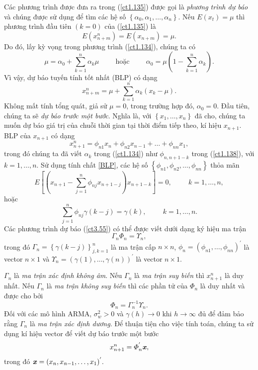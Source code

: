 \documentclass[12pt, a4paper,oneside]{book}
\theoremstyle{definition}
\begin{document}
Các phương trình được đưa ra trong (\ref{ct1.135}) được gọi là \textit{phương trình dự báo} và chúng được sử dụng để tìm các hệ số $\left\lbrace\alpha_{0}, \alpha_{1} ,\dots,\alpha_{n}\right\rbrace$. Nếu $E(x_{t}) =\mu $ thì phương trình đầu tiên $(k = 0)$ của (\ref{ct1.135}) là $$E(x_{n+m}^n)= E (x_{n+m})= \mu.$$
Do đó, lấy kỳ vọng trong phương trình (\ref{ct1.134}), chúng ta có
$$\mu= \alpha_{0} + \sum_{k=1}^{n} \alpha_k\mu \hspace{1cm} \text{hoặc} \hspace{1cm} \alpha_0 =\mu(1-\sum_{k=1}^{n}\alpha_k).$$ 	
Vì vậy, dự báo tuyến tính tốt nhất (BLP) có dạng
$$x_{n+m}^{n}=\mu+\sum_{k=1}^{n}\alpha_k(x_k-\mu).$$
Không mất tính tổng quát, giả sử $ \mu= 0$, trong trường hợp đó, $\alpha_{0} = 0.$ Đầu tiên, chúng ta sẽ \textit{dự báo trước một bước}. Nghĩa là, với $\left\lbrace x_{1}, \dots, x_{n}\right\rbrace$ đã cho, chúng ta muốn dự báo giá trị của chuỗi thời gian tại thời điểm tiếp theo, kí hiệu $x_{n+1}$. BLP của $x_{n+1}$ có dạng
\begin{equation}
x_{n+1}^n = \phi_{n1}x_{n}+ \phi_{n2}x_{n-1}+ \dots+ \phi_{nn}x_{1}, \label{ct1.138}
\end{equation}
trong đó chúng ta đã viết $\alpha_{k}$ trong (\ref{ct1.134}) như $\phi_{n,n+1-k}$ trong (\ref{ct1.138}), với $k = 1,\dots, n$. Sử dụng tính chất \ref{BLP}, các hệ số $\left\lbrace \phi_{n1}, \phi_{n2}, \dots, \phi_{nn}\right\rbrace$ thỏa mãn
$$E[(x_{n+1} - \sum_{j=1}^{n} \phi_{nj}x_{n+1-j})x_{n+1-k}] =0, \hspace{1cm} k=1, \dots, n,$$ hoặc 
\begin{equation}
\sum_{j=1}^{n}\phi_{nj}\gamma(k-j)=\gamma(k), \hspace{1cm} k=1, \dots, n. \label{ct3.55}
\end{equation}
Các phương trình dự báo (\ref{ct3.55}) có thể được viết dưới dạng ký hiệu ma trận
\begin{equation}
\Gamma_{n}\varPhi_{n}= \varUpsilon_{n}, \label{ct1.140}
\end{equation}
trong đó $\Gamma_n=\left\lbrace \gamma(k-j)\right\rbrace_{j, k=1}^{n}$ là ma trận cấp $n\times n$, $\phi_n=(\phi_{n1}, \dots, \phi_{nn})^{'}$ là vector $n\times 1$ và $\varUpsilon_n=(\gamma(1), \dots, \gamma(n))^{'}$ là vector $n\times 1$.

$\Gamma_{n}$ là \textit{ma trận xác định không âm}. Nếu $\Gamma_n$ là \textit{ma trận suy biến} thì $x_{n+1}^{n}$ là duy nhất. Nếu $\Gamma_n$ là \textit{ma trận không suy biến} thì các phần tử của $\varPhi_n$ là duy nhất và được cho bởi
\begin{equation}
\varPhi_{n}= \Gamma_{n}^{-1}\varUpsilon_{n}. \label{ct1.141}
\end{equation}
Đối với các mô hình ARMA, $\sigma^{2}_{w}> 0$ và $\gamma(h) \rightarrow 0$ khi $h \rightarrow  \infty$  đủ để đảm bảo rằng $\Gamma_n$ là \textit{ma trận xác định dương}. Để thuận tiện cho việc tính toán, chúng ta sử dụng kí hiệu vector để viết dự báo trước một bước
\begin{equation}
x^{n}_{n+1}= \varPhi_{n}^{'}\textbf{\textit{x}}, \label{ct1.142}	
\end{equation}
trong đó $\textbf{\textit{x}}= (x_{n}, x_{n-1}, \dots, x_{1})^{'}.$
\end{document}
